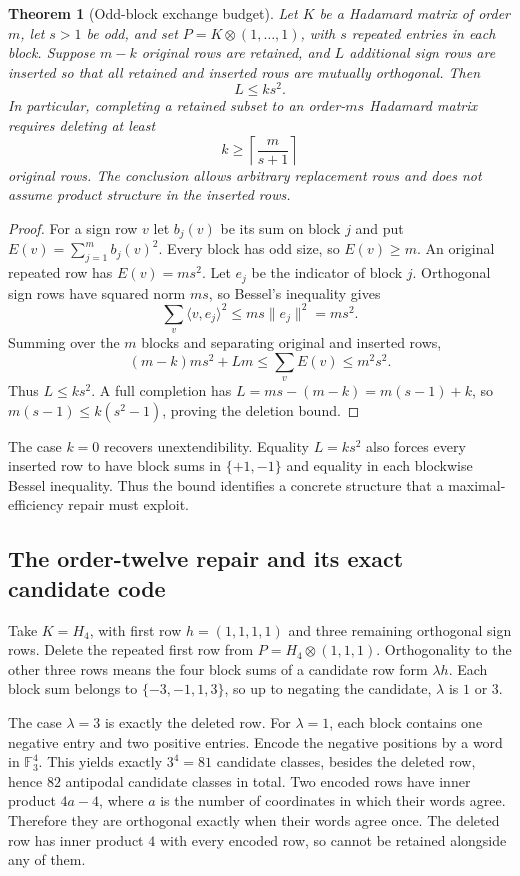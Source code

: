 \documentclass[11pt]{article}
\newtheorem{theorem}{Theorem}[section]
\begin{document}
\begin{theorem}[Odd-block exchange budget]
Let $K$ be a Hadamard matrix of order $m$, let $s>1$ be odd, and set
$P=K\otimes(1,\ldots,1)$, with $s$ repeated entries in each block.
Suppose $m-k$ original rows are retained, and $L$ additional sign rows
are inserted so that all retained and inserted rows are mutually
orthogonal. Then
\[
 L\le k s^2.
\]
In particular, completing a retained subset to an order-$ms$ Hadamard
matrix requires deleting at least
\[
 k\ge\left\lceil\frac{m}{s+1}\right\rceil
\]
original rows. The conclusion allows arbitrary replacement rows and
does not assume product structure in the inserted rows.
\end{theorem}
\begin{proof}
For a sign row $v$ let $b_j(v)$ be its sum on block $j$ and put
$E(v)=\sum_{j=1}^m b_j(v)^2$. Every block has odd size, so $E(v)\ge m$.
An original repeated row has $E(v)=ms^2$.
Let $e_j$ be the indicator of block $j$. Orthogonal sign rows have
squared norm $ms$, so Bessel's inequality gives
\[
 \sum_v\langle v,e_j\rangle^2\le ms\|e_j\|^2=ms^2.
\]
Summing over the $m$ blocks and separating original and inserted rows,
\[
 (m-k)ms^2+Lm\le\sum_v E(v)\le m^2s^2.
\]
Thus $L\le ks^2$. A full completion has
$L=ms-(m-k)=m(s-1)+k$, so
$m(s-1)\le k(s^2-1)$, proving the deletion bound.
\end{proof}

The case $k=0$ recovers unextendibility. Equality $L=ks^2$ also forces
every inserted row to have block sums in $\{+1,-1\}$ and equality in
each blockwise Bessel inequality. Thus the bound identifies a concrete
structure that a maximal-efficiency repair must exploit.

\subsection{The order-twelve repair and its exact candidate code}
Take $K=H_4$, with first row $h=(1,1,1,1)$ and three remaining
orthogonal sign rows. Delete the repeated first row from
$P=H_4\otimes(1,1,1)$. Orthogonality to the other three rows means
the four block sums of a candidate row form $\lambda h$.
Each block sum belongs to $\{-3,-1,1,3\}$, so up to negating the
candidate, $\lambda$ is $1$ or $3$.

The case $\lambda=3$ is exactly the deleted row. For $\lambda=1$,
each block contains one negative entry and two positive entries.
Encode the negative positions by a word in $\mathbb F_3^4$.
This yields exactly $3^4=81$ candidate classes, besides the deleted
row, hence $82$ antipodal candidate classes in total.
Two encoded rows have inner product $4a-4$, where $a$ is the number
of coordinates in which their words agree. Therefore they are
orthogonal exactly when their words agree once. The deleted row
has inner product $4$ with every encoded row, so cannot be retained
alongside any of them.
\end{document}
